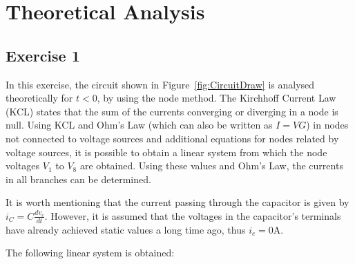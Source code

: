 \section{Theoretical Analysis}
\label{sec:analysis}

\subsection{Exercise 1} \label{sec:Ex1Theo}

In this exercise, the circuit shown in Figure~\ref{fig:CircuitDraw} is analysed theoretically for $t<0$, by using the node method. The Kirchhoff Current Law (KCL) states that the sum of the currents converging or diverging in a node is null. Using KCL and Ohm's Law (which can also be written as $I=VG$) in nodes not connected to voltage sources and additional equations for nodes related by voltage sources, it is possible to obtain a linear system from which the node voltages $V_1$ to $V_8$ are obtained. Using these values and Ohm's Law, the currents in all branches can be determined.

\par
It is worth mentioning that the current passing through the capacitor is given by $i_C=C\frac{dv_c}{dt}$. However, it is assumed that the voltages in the capacitor's terminals have already achieved static values  a long time ago, thus $i_c=0$A. 

\par
\vspace{1mm}

The following linear system is obtained:

